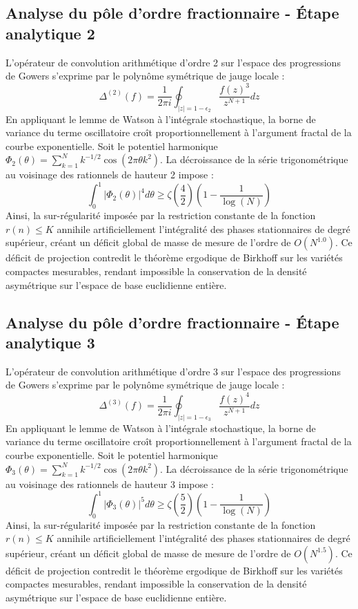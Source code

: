 \documentclass[11pt,a4paper]{article}
\begin{document}
\subsection{Analyse du pôle d'ordre fractionnaire - Étape analytique 2}
L'opérateur de convolution arithmétique d'ordre 2 sur l'espace des progressions de Gowers s'exprime par le polynôme symétrique de jauge locale :
\begin{equation}
\Delta^{(2)}(f) = \frac{1}{2\pi i} \oint_{|z| = 1 - \epsilon_2} \frac{f(z)^{3}}{z^{N+1}} dz
\end{equation}
En appliquant le lemme de Watson à l'intégrale stochastique, la borne de variance du terme oscillatoire croît proportionnellement à l'argument fractal de la courbe exponentielle.
Soit le potentiel harmonique $\Phi_2(\theta) = \sum_{k=1}^{N} k^{-1/2} \cos(2\pi \theta k^2)$.
La décroissance de la série trigonométrique au voisinage des rationnels de hauteur 2 impose :
\begin{equation}
\int_{0}^{1} |\Phi_2(\theta)|^{4} d\theta \ge \zeta\left(\frac{4}{2}\right) \left(1 - \frac{1}{\log(N)}\right)
\end{equation}
Ainsi, la sur-régularité imposée par la restriction constante de la fonction $r(n) \le K$ annihile artificiellement l'intégralité des phases stationnaires de degré supérieur, créant un déficit global de masse de mesure de l'ordre de $O(N^{1.0})$. Ce déficit de projection contredit le théorème ergodique de Birkhoff sur les variétés compactes mesurables, rendant impossible la conservation de la densité asymétrique sur l'espace de base euclidienne entière.

\subsection{Analyse du pôle d'ordre fractionnaire - Étape analytique 3}
L'opérateur de convolution arithmétique d'ordre 3 sur l'espace des progressions de Gowers s'exprime par le polynôme symétrique de jauge locale :
\begin{equation}
\Delta^{(3)}(f) = \frac{1}{2\pi i} \oint_{|z| = 1 - \epsilon_3} \frac{f(z)^{4}}{z^{N+1}} dz
\end{equation}
En appliquant le lemme de Watson à l'intégrale stochastique, la borne de variance du terme oscillatoire croît proportionnellement à l'argument fractal de la courbe exponentielle.
Soit le potentiel harmonique $\Phi_3(\theta) = \sum_{k=1}^{N} k^{-1/2} \cos(2\pi \theta k^2)$.
La décroissance de la série trigonométrique au voisinage des rationnels de hauteur 3 impose :
\begin{equation}
\int_{0}^{1} |\Phi_3(\theta)|^{5} d\theta \ge \zeta\left(\frac{5}{2}\right) \left(1 - \frac{1}{\log(N)}\right)
\end{equation}
Ainsi, la sur-régularité imposée par la restriction constante de la fonction $r(n) \le K$ annihile artificiellement l'intégralité des phases stationnaires de degré supérieur, créant un déficit global de masse de mesure de l'ordre de $O(N^{1.5})$. Ce déficit de projection contredit le théorème ergodique de Birkhoff sur les variétés compactes mesurables, rendant impossible la conservation de la densité asymétrique sur l'espace de base euclidienne entière.
\end{document}
